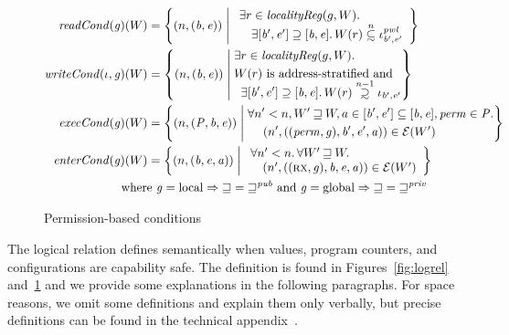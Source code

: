 \documentclass[format=acmsmall, review=false, screen=true]{acmart}
\renewcommand{\figurename}{Figure}
\newcommand\subsetsim{\mathrel{\ooalign{\raise.2ex\hbox{$\subset$}\cr
      \hidewidth\lower.8ex\hbox{\scalebox{0.9}{$\sim$}}\hidewidth\cr}}}
\newcommand\supsetsim{\mathrel{\ooalign{\raise.2ex\hbox{$\supset$}\cr
      \hidewidth\lower.8ex\hbox{\scalebox{0.9}{$\sim$}}\hidewidth\cr}}}
\newcommand{\nsubsim}[1][n]{\stackrel{\tiny{#1}}{\subsetsim}}
\newcommand{\nsupsim}[1][n]{\stackrel{\tiny{#1}}{\supsetsim}}
\newcommand\dominique[1]{{\color{purple} \sf \footnotesize {DD: #1}}\\}
\renewcommand\dominique[1]{}
\newcommand{\var}[1]{\mathit{#1}}
\newcommand{\gl}{\var{g}}
\newcommand{\addr}{\var{a}}
\newcommand{\start}{\var{b}}
\newcommand{\addrend}{\var{e}}
\newcommand{\perm}{\var{perm}}
\newcommand{\pwl}{\var{pwl}}
\newcommand{\plainfun}[2]{
  \ifthenelse{\equal{#2}{}}
  {\mathit{#1}}
  {\mathit{#1}(#2)}
}
\newcommand{\readCond}[1]{\plainfun{readCond}{#1}}
\newcommand{\writeCond}[1]{\plainfun{writeCond}{#1}}
\newcommand{\execCond}[1]{\plainfun{execCond}{#1}}
\newcommand{\entryCond}[1]{\plainfun{enterCond}{#1}}
\newcommand{\future}{\mathbin{\sqsupseteq}}
\newcommand{\futurewk}{\mathbin{\sqsupseteq}^{\var{pub}}}
\newcommand{\futurestr}{\mathbin{\sqsupseteq}^{\var{priv}}}
\newcommand{\asmType}{\plaindom{AsmType}}
\newcommand{\plaindom}[1]{\mathrm{#1}}
\newcommand{\intr}[2]{\mathcal{#1}}
\newcommand{\exprintr}[1]{\intr{E}{#1}}
\newcommand{\stder}{\exprintr{\asmType}}
\newcommand{\npair}[2][n]{\left(#1,#2 \right)}
\newcommand{\npairP}[2][n]{(#1,#2)}
\newcommand{\plainperm}[1]{\textsc{#1}}
\newcommand{\exec}{\plainperm{rx}}
\newcommand{\plainlocality}[1]{\mathrm{#1}}
\newcommand{\local}{\plainlocality{local}}
\newcommand{\glob}{\plainlocality{global}}
\begin{document}
{\begin{figure}[htb]
  \centering
  \begin{align*}
   \readCond{}(\gl)(W) &=  \left\{ \npair{(\start,\addrend)} \; \middle| \;
    \begin{array}{l}
       \exists r \in \var{localityReg}(g,W) \ldotp \\
\quad   \exists [\start',\addrend'] \supseteq [\start,\addrend] \ldotp W(r)\nsubsim[n] \iota_{\start',\addrend'}^\pwl 
    \end{array}
    \right\}\\
   \writeCond{}(\iota,\gl)(W) &=  \left\{
    \npair{(\start,\addrend)}
    \; \middle| \;
    \begin{aligned}
      & \exists r \in \var{localityReg}(g,W) \ldotp \\
      & W(r) \text{ is address-stratified and} \\[-0.2cm]
      & \;\; \exists [\start',\addrend'] \supseteq [\start,\addrend] \ldotp W(r)\nsupsim[n-1] \iota_{\start',\addrend'}
    \end{aligned} \right\}\\
   \execCond{}(\gl)(W) &= 
    \left\{
      \npairP{(\var{P}, \start,\addrend)}
     \; \middle| \;
    \begin{aligned}
      & \forall n' < n, W' \future W, a \in [\start',\addrend'] \subseteq [\start,\addrend], \perm \in \var{P} \ldotp \\
      & \;\;\;\; \npair[n']{((\perm,\gl),\start',\addrend',\addr)} \in \stder(W')\\
    \end{aligned} \right\} \\
   \entryCond{}(\gl)(W) &= 
    \left\{ \npair{(\start,\addrend,\addr)} \; \middle| \;
    \begin{array}{l}
      \forall n' < n \ldotp \forall W' \future W \ldotp\\
      \quad \npair[n']{((\exec,\gl),\start,\addrend,\addr)} \in \stder(W')
    \end{array}
    \right\} \\
   \text{where } \gl = \local \Rightarrow \future = \futurewk \text{ and } \gl = \glob \Rightarrow \future = \futurestr \span
  \end{align*}
\caption{Permission-based conditions}
\label{fig:perm-conds}
\end{figure}
}
The logical relation defines semantically when values, program
counters, and configurations are capability safe. The definition is
found in \figurename{}s~\ref{fig:logrel} and~\ref{fig:perm-conds} and
we provide some explanations in the following paragraphs. For space
reasons, we omit some definitions and explain them only verbally, but
precise definitions can be found in the technical
appendix~\citep{technical_appendix}.
\end{document}
